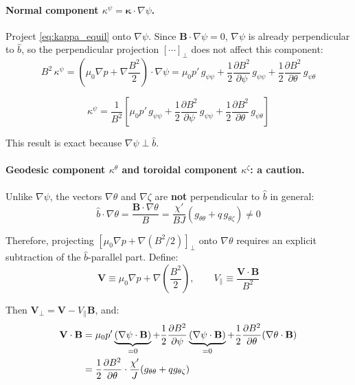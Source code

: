 \documentclass[12pt,a4paper]{article}
\begin{document}
\paragraph{Normal component $\kappa^\psi = \bm{\kappa}\cdot\nabla\psi$.}

Project \eqref{eq:kappa_equil} onto $\nabla\psi$. Since $\mathbf{B}\cdot\nabla\psi = 0$, $\nabla\psi$ is already perpendicular to $\hat{b}$, so the perpendicular projection $[\cdots]_\perp$ does not affect this component:
\begin{equation}
    B^2\,\kappa^\psi = \left(\mu_0\nabla p + \nabla\frac{B^2}{2}\right)\cdot\nabla\psi
    = \mu_0 p'\,g_{\psi\psi} + \frac{1}{2}\frac{\partial B^2}{\partial\psi}\,g_{\psi\psi} + \frac{1}{2}\frac{\partial B^2}{\partial\theta}\,g_{\psi\theta}
\end{equation}

\begin{equation}
    \boxed{\kappa^\psi = \frac{1}{B^2}\!\left[
    \mu_0 p'\,g_{\psi\psi}
    + \frac{1}{2}\frac{\partial B^2}{\partial\psi}\,g_{\psi\psi}
    + \frac{1}{2}\frac{\partial B^2}{\partial\theta}\,g_{\psi\theta}
    \right]}
    \label{eq:kappa_psi}
\end{equation}

This result is exact because $\nabla\psi\perp\hat{b}$.

\paragraph{Geodesic component $\kappa^\theta$ and toroidal component $\kappa^\zeta$: a caution.}

Unlike $\nabla\psi$, the vectors $\nabla\theta$ and $\nabla\zeta$ are \textbf{not} perpendicular to $\hat{b}$ in general:
\begin{equation}
    \hat{b}\cdot\nabla\theta = \frac{\mathbf{B}\cdot\nabla\theta}{B} = \frac{\chi'}{BJ}(g_{\theta\theta} + q\,g_{\theta\zeta}) \neq 0
\end{equation}

Therefore, projecting $[\mu_0\nabla p + \nabla(B^2/2)]_\perp$ onto $\nabla\theta$ requires an explicit subtraction of the $\hat{b}$-parallel part. Define:
\begin{equation}
    \mathbf{V} \equiv \mu_0\nabla p + \nabla\!\left(\frac{B^2}{2}\right), \qquad V_\parallel \equiv \frac{\mathbf{V}\cdot\mathbf{B}}{B^2}
\end{equation}

Then $\mathbf{V}_\perp = \mathbf{V} - V_\parallel\mathbf{B}$, and:
\begin{align}
    \mathbf{V}\cdot\mathbf{B} &= \mu_0 p'\underbrace{(\nabla\psi\cdot\mathbf{B})}_{=0} + \frac{1}{2}\frac{\partial B^2}{\partial\psi}\underbrace{(\nabla\psi\cdot\mathbf{B})}_{=0} + \frac{1}{2}\frac{\partial B^2}{\partial\theta}(\nabla\theta\cdot\mathbf{B}) \notag\\
    &= \frac{1}{2}\frac{\partial B^2}{\partial\theta}\cdot\frac{\chi'}{J}(g_{\theta\theta}+qg_{\theta\zeta})
    \label{eq:VdotB}
\end{align}
\end{document}
